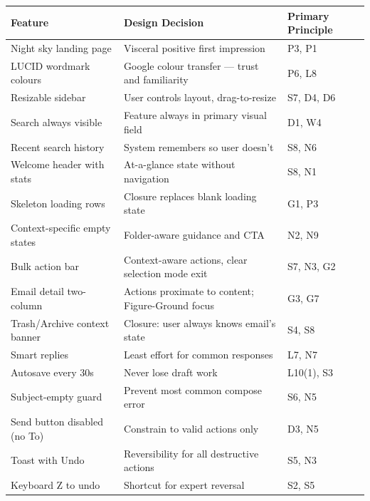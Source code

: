 \documentclass[12pt,a4paper]{report}
\begin{document}
\begin{table}[H]
\centering
\small
\begin{tabularx}{\textwidth}{lXl}
  \toprule
  \textbf{Feature} & \textbf{Design Decision} & \textbf{Primary Principle}\\
  \midrule
  Night sky landing page       & Visceral positive first impression                  & P3, P1\\
  LUCID wordmark colours       & Google colour transfer — trust and familiarity       & P6, L8\\
  Resizable sidebar            & User controls layout, drag-to-resize                & S7, D4, D6\\
  Search always visible        & Feature always in primary visual field               & D1, W4\\
  Recent search history        & System remembers so user doesn't                    & S8, N6\\
  Welcome header with stats    & At-a-glance state without navigation                & S8, N1\\
  Skeleton loading rows        & Closure replaces blank loading state                & G1, P3\\
  Context-specific empty states & Folder-aware guidance and CTA                      & N2, N9\\
  Bulk action bar              & Context-aware actions, clear selection mode exit    & S7, N3, G2\\
  Email detail two-column      & Actions proximate to content; Figure-Ground focus   & G3, G7\\
  Trash/Archive context banner & Closure: user always knows email's state            & S4, S8\\
  Smart replies                & Least effort for common responses                   & L7, N7\\
  Autosave every 30s           & Never lose draft work                               & L10(1), S3\\
  Subject-empty guard          & Prevent most common compose error                   & S6, N5\\
  Send button disabled (no To) & Constrain to valid actions only                     & D3, N5\\
  Toast with Undo              & Reversibility for all destructive actions            & S5, N3\\
  Keyboard Z to undo           & Shortcut for expert reversal                        & S2, S5\\

\end{tabularx}
\end{table}
\end{document}
